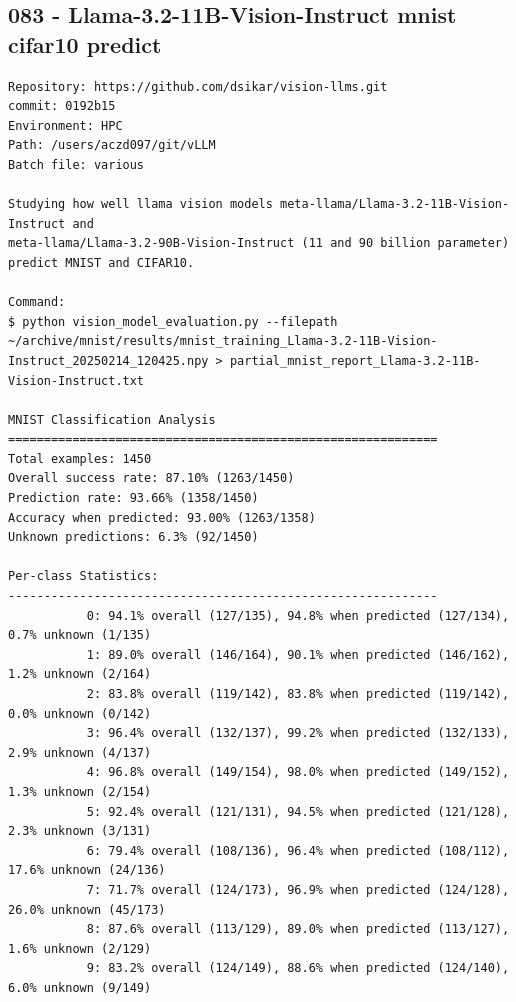 \subsection{083 - Llama-3.2-11B-Vision-Instruct mnist cifar10 predict}
\label{app_res:083}
\begin{verbatim}
Repository: https://github.com/dsikar/vision-llms.git
commit: 0192b15
Environment: HPC 
Path: /users/aczd097/git/vLLM
Batch file: various

Studying how well llama vision models meta-llama/Llama-3.2-11B-Vision-Instruct and
meta-llama/Llama-3.2-90B-Vision-Instruct (11 and 90 billion parameter) predict MNIST and CIFAR10.

Command:
$ python vision_model_evaluation.py --filepath ~/archive/mnist/results/mnist_training_Llama-3.2-11B-Vision-Instruct_20250214_120425.npy > partial_mnist_report_Llama-3.2-11B-Vision-Instruct.txt

MNIST Classification Analysis
============================================================
Total examples: 1450
Overall success rate: 87.10% (1263/1450)
Prediction rate: 93.66% (1358/1450)
Accuracy when predicted: 93.00% (1263/1358)
Unknown predictions: 6.3% (92/1450)

Per-class Statistics:
------------------------------------------------------------
           0: 94.1% overall (127/135), 94.8% when predicted (127/134), 0.7% unknown (1/135)
           1: 89.0% overall (146/164), 90.1% when predicted (146/162), 1.2% unknown (2/164)
           2: 83.8% overall (119/142), 83.8% when predicted (119/142), 0.0% unknown (0/142)
           3: 96.4% overall (132/137), 99.2% when predicted (132/133), 2.9% unknown (4/137)
           4: 96.8% overall (149/154), 98.0% when predicted (149/152), 1.3% unknown (2/154)
           5: 92.4% overall (121/131), 94.5% when predicted (121/128), 2.3% unknown (3/131)
           6: 79.4% overall (108/136), 96.4% when predicted (108/112), 17.6% unknown (24/136)
           7: 71.7% overall (124/173), 96.9% when predicted (124/128), 26.0% unknown (45/173)
           8: 87.6% overall (113/129), 89.0% when predicted (113/127), 1.6% unknown (2/129)
           9: 83.2% overall (124/149), 88.6% when predicted (124/140), 6.0% unknown (9/149)


\end{verbatim}
